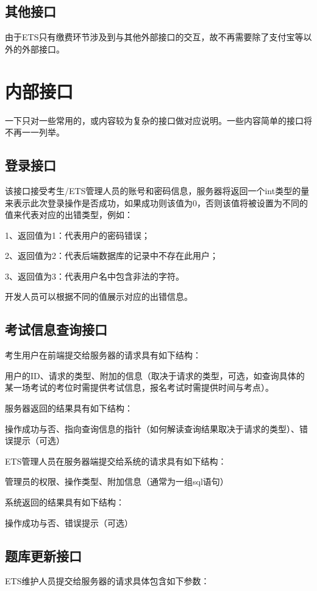 \subsection{其他接口}
由于ETS只有缴费环节涉及到与其他外部接口的交互，故不再需要除了支付宝等以外的外部接口。

\section{内部接口}
一下只对一些常用的，或内容较为复杂的接口做对应说明。一些内容简单的接口将不再一一列举。

\subsection{登录接口}
该接口接受考生/ETS管理人员的账号和密码信息，服务器将返回一个int类型的量来表示此次登录操作是否成功，如果成功则该值为0，否则该值将被设置为不同的值来代表对应的出错类型，例如：

1、返回值为1：代表用户的密码错误；

2、返回值为2：代表后端数据库的记录中不存在此用户；

3、返回值为3：代表用户名中包含非法的字符。

开发人员可以根据不同的值展示对应的出错信息。

\subsection{考试信息查询接口}
考生用户在前端提交给服务器的请求具有如下结构：

用户的ID、请求的类型、附加的信息（取决于请求的类型，可选，如查询具体的某一场考试的考位时需提供考试信息，报名考试时需提供时间与考点）。

服务器返回的结果具有如下结构：

操作成功与否、指向查询信息的指针（如何解读查询结果取决于请求的类型）、错误提示（可选）

ETS管理人员在服务器端提交给系统的请求具有如下结构：

管理员的权限、操作类型、附加信息（通常为一组sql语句）

系统返回的结果具有如下结构：

操作成功与否、错误提示（可选）

\subsection{题库更新接口}
ETS维护人员提交给服务器的请求具体包含如下参数：

